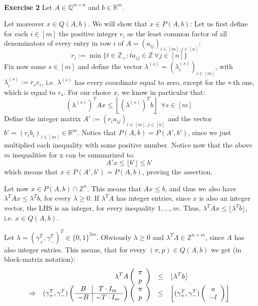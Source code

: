 \documentclass[12pt]{article}
\newenvironment{a_enum}{\begin{enumerate}[label=(\alph{*})]}{\end{enumerate}} %
\begin{document}
\ \\
{\bf Exercise 2} Let $A\in\mathbb{Q}^{m\times n}$ and $b\in\mathbb{R}^m$.
\begin{a_enum} 
\item Let moreover $x\in Q(A,b)$. We will show that $x\in P(A,b)$: Let us first define for each $i\in[m]$ the positive integer $r_i$ as the least common factor of all denominators of every entry in row $i$ of $A=(a_{ij})_{i\in[m],j\in[n]}$:
$$r_i:=\min\{t\in\mathbb{Z}_+:ta_{ij}\in\mathbb{Z}\ \forall j\in[n]\}$$
Fix now some $s\in[m]$ and define the vector $\lambda^{(s)}=\left(\lambda^{(s)}_i\right)_{i\in[m]}$, with $\lambda^{(s)}_i:=r_se_i$, i.e. $\lambda^{(s)}$ has every coordinate equal to zero, except for the $s$-th one, which is equal to $r_s$. For our choice $x$, we know in particular that:
$$\left(\lambda^{(s)}\right)^TAx\leq\left\lfloor\left(\lambda^{(s)}\right)^Tb\right\rfloor\ \ \forall s\in[m]$$
Define the integer matrix $A':=(r_ia_{ij})_{i\in[m],j\in[n]}$ and the vector $b'=(r_ib_i)_{i\in[m]}\in\mathbb{R}^m$. Notice that $P(A,b)=P(A',b')$, since we just multiplied each inequality with some positive number. Notice now that the above $m$ inequalities for x can be summarized to:
$$A'x\leq\lfloor b'\rfloor\leq b'$$
which means that $x\in P(A',b')=P(A,b)$, proving the assertion.
\item Let now $x\in P(A,b)\cap\mathbb{Z}^n$. This means that $Ax\leq b$, and thus we also have $\lambda^TAx\leq\lambda^Tb$, for every $\lambda\geq0$. If $\lambda^TA$ has integer entries, since $x$ is also an integer vector, the LHS is an integer, for every inequality $1,\ldots,m$. Thus, $\lambda^TAx\leq\lfloor \lambda^Tb\rfloor$, i.e. $x\in Q(A,b)$.
\item Let $\lambda=(\gamma_+^T,\gamma_-^T)^T\in\{0,1\}^{2m}$. Obviously $\lambda\geq0$ and $\lambda^TA\in\mathbb{Z}^{n+m}$, since $A$ has also integer entries. This means, that for every $(\pi,p)\in Q(A,b)$ we get (in block-matrix notation):
$$\begin{array}{c>{\displaystyle}rc>{\displaystyle}l}&\lambda^TA\left(\begin{array}{c}\pi\\p\\\end{array}\right)&\leq&\lfloor\lambda^Tb\rfloor\\
\Rightarrow&(\gamma_+^T,\gamma_-^T)\left(\begin{array}{c|c}B&T\cdot I_m\\\hline-B&-T\cdot I_m\\\end{array}\right)\left(\begin{array}{c}\pi\\p\\\end{array}\right)&\leq&\left\lfloor(\gamma_+^T,\gamma_-^T)\left(\begin{array}{c}u\\-l\\\end{array}\right)\right\rfloor\\

\end{array}$$
\end{a_enum}
\end{document}
